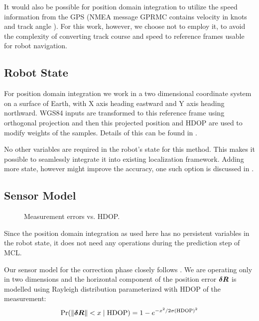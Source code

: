It would also be possible for position domain integration to utilize the speed information
from the GPS (NMEA message GPRMC contains velocity in knots and track angle \cite{depriest}).
For this work, however, we choose not to employ it, to avoid the complexity of converting
track course and speed to reference frames usable for robot navigation.

\subsection{Robot State}
For position domain integration we work in a two dimensional coordinate
system on a surface of Earth, with X axis heading eastward and Y axis heading northward.
WGS84 inputs are transformed to this reference frame using orthogonal projection and then
this projected position and HDOP are used to modify weights of the samples.
Details of this can be found in .

No other variables are required in the robot's state for this method.
This makes it possible to seamlessly integrate it into existing localization framework.
Adding  more state, however might improve the accuracy, one such option
is discussed in .

\subsection{Sensor Model}
\label{sec:wgs84-hdop-error}

\begin{figure}[htp]
	\centering
	\noindent{}
	\caption{Measurement errors vs. HDOP.}
	\label{fig:wgs84-hdop-error}
\end{figure}

Since the position domain integration as used here has no persistent variables in the
robot state, it does not need any operations during the prediction step of MCL.

Our sensor model for the correction phase closely follows \cite{www-wilson}.
We are operating only in two dimensions and
the horizontal component of the position error  \(\bm{\delta R}\) is modelled using Rayleigh distribution
parameterized with HDOP of the measurement:
\begin{equation}
	\operatorname{\mathrm{Pr}}(\lVert\bm{\delta R}\rVert < x \mid \mathrm{HDOP}) =
		1 - e^{-x^2/2\sigma(\mathrm{HDOP})^2}
\end{equation}

